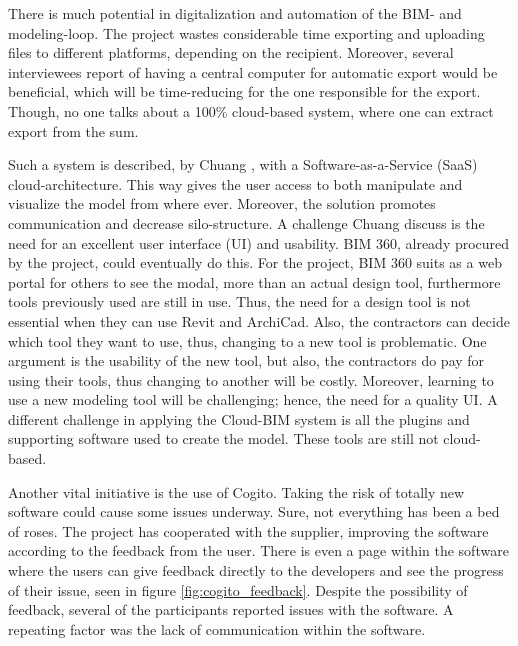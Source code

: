 There is much potential in digitalization and automation of the BIM- and modeling-loop. The project wastes considerable time exporting and uploading files to different platforms, depending on the recipient. Moreover, several interviewees report of having a central computer for automatic export would be beneficial, which will be time-reducing for the one responsible for the export. Though, no one talks about a 100\% cloud-based system, where one can extract export from the sum. 

Such a system is described, by Chuang \cite{chuang2011applying}, with a Software-as-a-Service (SaaS) cloud-architecture. This way gives the user access to both manipulate and visualize the model from where ever. Moreover, the solution promotes communication and decrease silo-structure. A challenge Chuang discuss is the need for an excellent user interface (UI) and usability. BIM 360, already procured by the project, could eventually do this. For the project, BIM 360 suits as a web portal for others to see the modal, more than an actual design tool, furthermore tools previously used are still in use. Thus, the need for a design tool is not essential when they can use Revit and ArchiCad. Also, the contractors can decide which tool they want to use, thus, changing to a new tool is problematic. One argument is the usability of the new tool, but also, the contractors do pay for using their tools, thus changing to another will be costly. Moreover, learning to use a new modeling tool will be challenging; hence, the need for a quality UI. A different challenge in applying the Cloud-BIM system is all the plugins and supporting software used to create the model. These tools are still not cloud-based.

Another vital initiative is the use of Cogito. Taking the risk of totally new software could cause some issues underway. Sure, not everything has been a bed of roses. The project has cooperated with the supplier, improving the software according to the feedback from the user. There is even a page within the software where the users can give feedback directly to the developers and see the progress of their issue, seen in figure \ref{fig:cogito_feedback}. Despite the possibility of feedback, several of the participants reported issues with the software. A repeating factor was the lack of communication within the software. 

